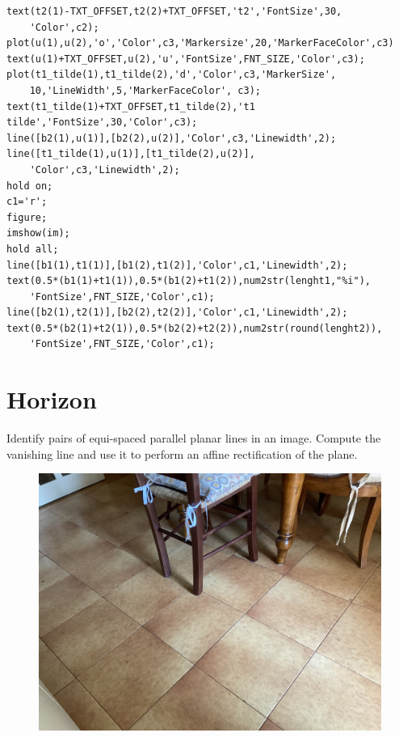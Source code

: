 \documentclass[12pt, a4paper]{report}
\newtheorem[style=M,bodystyle=\normalfont]{theorem}{Theorem}
\newtheorem[style=M,bodystyle=\normalfont]{corollary}{Corollary}
\newtheorem[style=M,bodystyle=\normalfont]{lemma}{Lemma}
\newtheorem[style=M,bodystyle=\normalfont]{definition}{Definition}
\begin{document}
\begin{lstlisting}
text(t2(1)-TXT_OFFSET,t2(2)+TXT_OFFSET,'t2','FontSize',30,
    'Color',c2);
plot(u(1),u(2),'o','Color',c3,'Markersize',20,'MarkerFaceColor',c3)
text(u(1)+TXT_OFFSET,u(2),'u','FontSize',FNT_SIZE,'Color',c3);
plot(t1_tilde(1),t1_tilde(2),'d','Color',c3,'MarkerSize',
    10,'LineWidth',5,'MarkerFaceColor', c3);
text(t1_tilde(1)+TXT_OFFSET,t1_tilde(2),'t1 tilde','FontSize',30,'Color',c3);
line([b2(1),u(1)],[b2(2),u(2)],'Color',c3,'Linewidth',2);
line([t1_tilde(1),u(1)],[t1_tilde(2),u(2)],
    'Color',c3,'Linewidth',2);
hold on;
c1='r';
figure;
imshow(im);
hold all;
line([b1(1),t1(1)],[b1(2),t1(2)],'Color',c1,'Linewidth',2);
text(0.5*(b1(1)+t1(1)),0.5*(b1(2)+t1(2)),num2str(lenght1,"%i"),
    'FontSize',FNT_SIZE,'Color',c1);
line([b2(1),t2(1)],[b2(2),t2(2)],'Color',c1,'Linewidth',2);
text(0.5*(b2(1)+t2(1)),0.5*(b2(2)+t2(2)),num2str(round(lenght2)),
    'FontSize',FNT_SIZE,'Color',c1);
        \end{lstlisting} 

        \newpage 
    
        \section{Horizon}
        Identify pairs of equi-spaced parallel planar lines in an image. Compute the vanishing line and use it to perform an affine rectification of the plane.
        \begin{figure}[H]
            \centering
            \includegraphics[width=0.75\linewidth]{images/floor.png}
        \end{figure}
\end{document}
